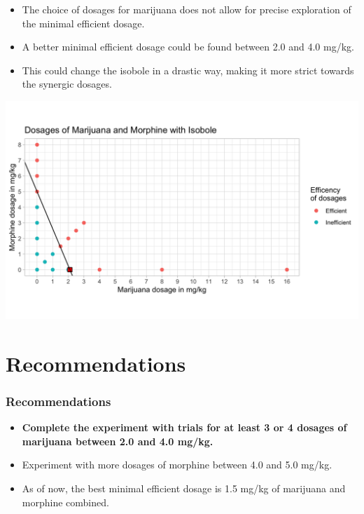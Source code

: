 \documentclass[14pt]{beamer}
\begin{document}
\begin{frame}
\begin{itemize}[label={$\blacktriangleright$}]
\item The choice of dosages for marijuana does not allow for precise exploration of the minimal efficient dosage.
\item A better minimal efficient dosage could be found between 2.0 and 4.0 mg/kg.
\item This could change the isobole in a drastic way, making it more strict towards the synergic dosages.
\end{itemize}
\end{frame}

\begin{frame}
\includegraphics[scale=0.23]{mari_fake.png}
\end{frame}

\section{Recommendations}

\begin{frame}
\frametitle{Recommendations}
\begin{itemize}[label={\checkmark}]
\item \textbf{Complete the experiment with trials for at least 3 or 4 dosages of marijuana between 2.0 and 4.0 mg/kg.}
\item Experiment with more dosages of morphine between 4.0 and 5.0 mg/kg.
\item As of now, the best minimal efficient dosage is 1.5 mg/kg of marijuana and morphine combined.
\end{itemize}
\end{frame}
\end{document}
